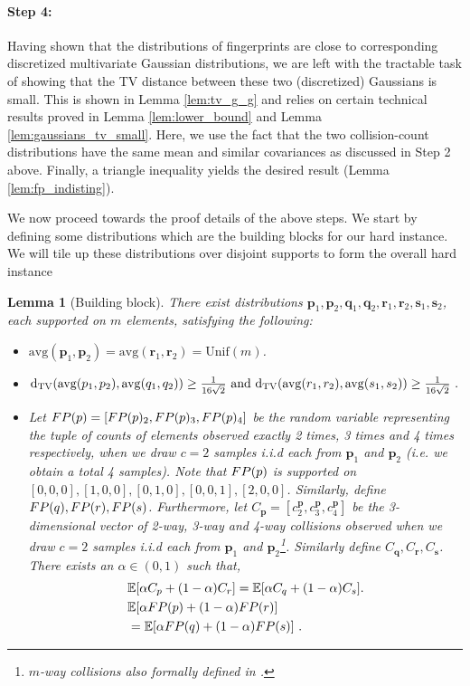 \documentclass[10pt]{article} %
\newcommand{\E}{\mathbb{E}}
\theoremstyle{plain}
\newtheorem{lemma}[theorem]{Lemma}
\newcommand{\bp}{\textbf{p}}
\newcommand{\bq}{\textbf{q}}
\newcommand{\br}{\textbf{r}}
\newcommand{\bs}{\textbf{s}}
\newcommand{\dtv}{\mathrm{d_{TV}}}
\newcommand{\avg}{\mathrm{avg}}
\begin{document}
\paragraph{Step 4:} Having shown that the distributions of fingerprints are close to corresponding discretized multivariate Gaussian distributions, we are left with the tractable task of showing that the TV distance between these two (discretized) Gaussians is small. This is shown in Lemma \ref{lem:tv_g_g} and relies on certain technical results proved in Lemma \ref{lem:lower_bound} and Lemma \ref{lem:gaussians_tv_small}. Here, we use the fact that the two collision-count distributions have the same mean and similar covariances as discussed in Step 2 above. Finally, a triangle inequality yields the desired result (Lemma \ref{lem:fp_indisting}). 


We now proceed towards the proof details of the above steps. We start by defining some distributions which are the building blocks for our hard instance.  We will tile up these distributions over disjoint supports to form the overall hard instance%

\begin{lemma}[Building block]
	\label{lem:lb_builder}
	There exist distributions $\bp_1,\bp_2, \bq_1,\bq_2, \br_1,\br_2, \bs_1,\bs_2$, each supported on $m$ elements, satisfying the following:
	\begin{itemize}
		\item[(1)] $\avg(\bp_1, \bp_2) = \avg(\br_1, \br_2) = \mathrm{Unif}(m)$.
		\item[(2)] $\dtv(\avg(\bp_1,\bp_2),\avg(\bq_1,\bq_2)) \geq \frac{1}{16\sqrt{2}} \text{ and }  \\ \dtv(\avg(\br_1,\br_2),\avg(\bs_1,\bs_2)) \geq \frac{1}{16\sqrt{2}}~.$
		\item[(3)] Let $\fp = [\fp_2, \fp_3, \fp_4]$ be the random variable representing the tuple of counts of elements observed exactly 2 times, 3 times and 4 times respectively, when we draw $c=2$ samples i.i.d each from $\bp_1$ and $\bp_2$ (i.e. we obtain a total 4 samples). Note that $\fp$ is supported on $[0,0,0],[1,0,0],[0,1,0],[0,0,1],[2,0,0]$. Similarly, define $\fq,\fr,\fs$. Furthermore, let $C_{\bp}=[c^{\bp}_2, c^\bp_3, c^\bp_4]$ be the 3-dimensional vector of 2-way, 3-way and 4-way collisions observed when we draw $c=2$ samples i.i.d each from $\bp_1$ and $\bp_2$\footnote{$m$-way collisions also formally defined in .}. Similarly define $C_{\bq},C_{\br},C_{\bs}$. There exists an $\alpha \in (0,1)$ such that,
		\begin{align*}
			&\E[\alpha C_{\bp} + (1-\alpha)C_{\br}]=\E[\alpha C_{\bq} + (1-\alpha) C_{\bs}].\\
			&\E[\alpha \fp + (1-\alpha)\fr]\\
			&=\E[\alpha \fq + (1-\alpha) \fs]~.
		\end{align*}
	\end{itemize}
\end{lemma}
\end{document}

